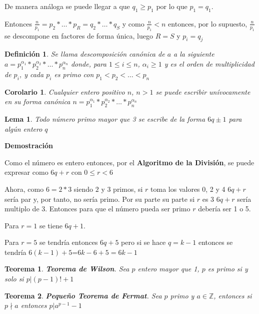 \documentclass[a4paper,12pt]{report}
\newtheorem*{teo}{Teorema}
\newtheorem*{cor}{Corolario}
\newtheorem*{dfn}{Definición}
\newtheorem*{lem}{Lema}
\begin{document}
De manera análoga se puede llegar a que $q_1\geq p_1$ por lo que $p_1=q_1$.

Entonces $\frac{n}{p_1}=p_2*\dots *p_R=q_2*\dots *q_S$ y como $\frac{n}{p_1}<n$ entonces, por lo supuesto, $\frac{n}{p_1}$ se descompone en factores de forma única, luego $R=S$ y $p_i=q_j$


\begin{dfn}
 Se llama descomposición canónica de $a$ a la siguiente\\
 $a=p^{\alpha_1}_1*p^{\alpha_2}_2*\dots*p^{\alpha_n}_n$ donde, para  $1\leq i \leq n$,  $\alpha_i\geq1$ y es el orden de multiplicidad de $p_i$, y cada $p_i$ es primo con $p_1<p_2<\dots < p_n$
\end{dfn}

\begin{cor}
 Cualquier entero positivo $n$, $n>1$ se puede escribir unívocamente en su forma canónica $n=p^{\alpha_1}_1*p^{\alpha_2}_2*\dots*p^{\alpha_n}_n$
\end{cor}


\begin{lem}
 Todo número primo mayor que 3 se escribe de la forma $6q\pm1$ para algún entero $q$
\end{lem}

\textbf{Demostración}

Como el número es entero entonces, por el \textbf{Algoritmo de la División}, se puede expresar como 
$6q+r$ con $0\leq r < 6$

Ahora, como $6=2*3$ siendo $2$ y $3$ primos, si $r$ toma los valores 0, 2 y 4 $6q+r$ sería par y, por tanto, no sería primo. Por su parte su parte si $r$ es 3 $6q+r$ sería  multiplo de 3. Entonces para que el número pueda ser primo $r$ debería ser 1 o 5.

Para $r=1$ se tiene $6q+1$.

Para $r=5$ se tendría entonces $6q+5$ pero si se hace $q=k-1$ entonces se tendría $6(k-1)+5$=$6k-6+5=6k-1$

\begin{teo}
 \textbf{Teorema de Wilson}. Sea $p$ entero mayor que 1, $p$ es primo si y solo si $p|(p-1)!+1$
\end{teo}


\begin{teo}
 \textbf{Pequeño Teorema de Fermat}. Sea $p$ primo y $a\in\mathbb{Z}$, entonces si $p\nmid a$ entonces $p|a^{p-1}-1$
\end{teo}
\end{document}
